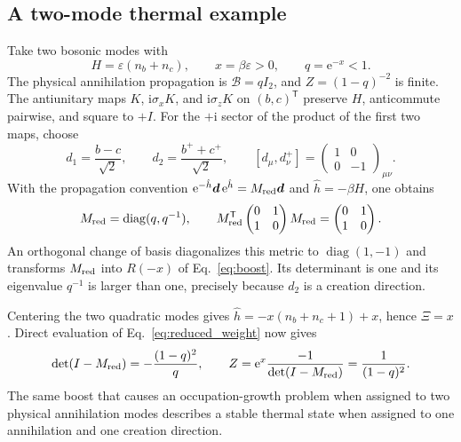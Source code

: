 \documentclass[11pt,a4paper]{article}
\newcommand{\diag}{\operatorname{diag}}
\newcommand{\ee}{\mathrm{e}}
\newcommand{\ii}{\mathrm{i}}
\newcommand{\trans}{\mathsf{T}}
\newcommand{\mc}[1]{\mathcal{#1}}
\newcommand{\bb}[1]{\bm{#1}}
\begin{document}
\subsection*{A two-mode thermal example}

Take two bosonic modes with
\begin{equation}
    H=\varepsilon(n_b+n_c),\qquad
    x=\beta\varepsilon>0,\qquad q=\ee^{-x}<1.
    \label{eq:thermal_model}
\end{equation}
The physical annihilation propagation is $\mc B=qI_2$, and
$Z=(1-q)^{-2}$ is finite. The antiunitary maps
$K$, $\ii\sigma_xK$, and $\ii\sigma_zK$ on $(b,c)^\trans$
preserve $H$, anticommute pairwise, and square to $+I$.
For the $+\ii$ sector of the product of the first two maps, choose
\begin{equation}
    d_1=\frac{b-c}{\sqrt2},\qquad
    d_2=\frac{b^{+}+c^{+}}{\sqrt2},
    \qquad
    [d_\mu,d_\nu^{+}]=
       \begin{pmatrix}1&0\\0&-1\end{pmatrix}_{\mu\nu}.
    \label{eq:thermal_sector}
\end{equation}
With the propagation convention
$\ee^{-\hat h}\bb d\,\ee^{\hat h}=M_{\rm red}\bb d$ and
$\hat h=-\beta H$, one obtains
\begin{equation}
    M_{\rm red}=\diag(q,q^{-1}),\qquad
    M_{\rm red}^\trans
       \begin{pmatrix}0&1\\1&0\end{pmatrix}M_{\rm red}
       =\begin{pmatrix}0&1\\1&0\end{pmatrix}.
    \label{eq:thermal_metric}
\end{equation}
An orthogonal change of basis diagonalizes this metric to
$\diag(1,-1)$ and transforms $M_{\rm red}$ into $R(-x)$ of
Eq.~\eqref{eq:boost}. Its determinant is one and its eigenvalue $q^{-1}$
is larger than one, precisely because $d_2$ is a creation direction.

Centering the two quadratic modes gives
$\hat h=-x(n_b+n_c+1)+x$, hence $\Xi=x$. Direct evaluation of
Eq.~\eqref{eq:reduced_weight} now gives
\begin{equation}
    \det(I-M_{\rm red})=-\frac{(1-q)^2}{q},
    \qquad
    Z=\ee^x\frac{-1}{\det(I-M_{\rm red})}
      =\frac1{(1-q)^2}.
    \label{eq:thermal_weight}
\end{equation}
The same boost that causes an occupation-growth problem when assigned
to two physical annihilation modes describes a stable thermal state
when assigned to one annihilation and one creation direction.
\end{document}
